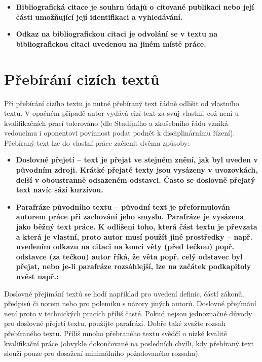 \begin{itemize}
  \item{\bf Bibliografická citace \rm je souhrn údajů o citované publikaci nebo její části umožňující její identifikaci a vyhledávání.}
  \item{\bf Odkaz na bibliografickou citaci \rm je odvolání se v textu na bibliografickou citaci uvedenou na jiném místě práce.}
\end{itemize}

\section{Přebírání cizích textů}

Při přebírání cizího textu je nutné přebíraný text řádně odlišit od vlastního textu. V opačném případě autor vydává cizí text za svůj vlastní, což není u kvalifikačních prací tolerováno (dle Studijního a zkušebního řádu vzniká vedoucímu i oponentovi povinnost podat podnět k disciplinárnímu řízení).
Přebíraný text lze do vlastní práce začlenit dvěma způsoby:

\begin{itemize}
  \item{\bf Doslovné přejetí \rm -- text je přejat ve stejném znění, jak byl uveden v původním zdroji. Krátké přejaté texty jsou vysázeny v uvozovkách, delší v oboustranně odsazeném odstavci. Často se doslovně přejatý text navíc sází kurzívou.}
  \item{\bf Parafráze původního textu \rm -- původní text je přeformulován autorem práce při zachování jeho smyslu. Parafráze je vysázena jako běžný text práce. K odlišení toho, která část textu je převzata a která je vlastní, proto autor musí použít jiné prostředky -- např. uvedením odkazu na citaci na konci věty (před tečkou) popř. odstavce (za tečkou) autor říká, že věta popř. celý odstavec byl přejat, nebo je-li parafráze rozsáhlejší, lze na začátek podkapitoly uvést např.: }
\end{itemize}

Doslovné přejímání textů se hodí například pro uvedení definic, částí zákonů, předpisů či norem nebo pro polemiku s názory jiných autorů. Doslovné přejímání není proto v technických pracích příliš časté. Pokud nejsou jednoznačné důvody pro doslovné přejetí textu, použijte parafrázi. Dobře také zvažte rozsah přebíraného textu. Příliš mnoho přebraného textu svědčí o nízké kvalitě kvalifikační práce (obvykle dokončované na posledních chvíli, kdy přebíraný text slouží pouze pro dosažení minimálního požadovaného rozsahu).

